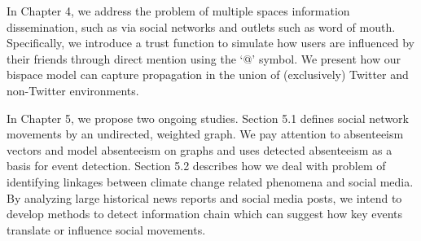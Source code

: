 In Chapter 4, we address the problem of multiple spaces information dissemination, such as via social networks and outlets such as word of mouth. Specifically, we introduce a trust function to simulate how users are influenced by their friends through direct mention using the `@' symbol. We present how our bispace model can capture propagation in the union of (exclusively) Twitter and non-Twitter environments.

In Chapter 5, we propose two ongoing studies. Section 5.1 defines social network movements by an undirected, weighted graph. We pay attention to absenteeism vectors and model absenteeism on graphs and uses detected absenteeism as a basis for event detection. Section 5.2 describes how we
deal with problem of identifying linkages between climate change related
phenomena and social media. By analyzing large historical news reports and social media posts, we intend to develop methods to detect information chain which can suggest how key events translate or
influence social movements.





